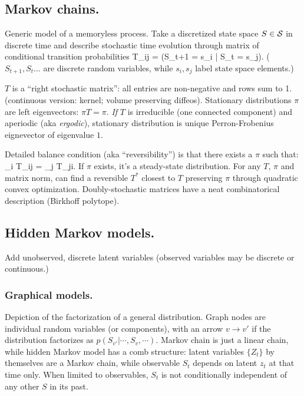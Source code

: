 \documentclass[notitlepage,openany,11pt]{report}
\theoremstyle{plain}%
\numberwithin{equation}{section}
\begin{document}
\subsection{Markov chains.} 
Generic model of a memoryless process. Take a discretized state space $S \in \mathcal{S}$ in discrete time and describe stochastic time evolution through matrix of conditional transition probabilities
\be
T_{ij} = (S_{t+1} = s_{i} | S_{t} = s_{j}).
\ee
($S_{t+1}, S_{t}...$ are discrete random variables, while $s_{i}, s_{j}$ label state space elements.)

$T$ is a ``right stochastic matrix'': all entries are non-negative and rows sum to 1. (continuous version: kernel; volume preserving diffeos). Stationary distributions $\pi$ are left eigenvectors: $\pi T = \pi$. \emph{If} $T$ is irreducible (one connected component) and aperiodic (aka \emph{ergodic}), stationary distribution is unique Perron-Frobenius eignevector of eigenvalue $1$.

Detailed balance condition (aka ``reversibility'') is that there exists a $\pi$ such that:
\be
\pi_{i} T_{ij} = \pi_{j} T_{ji}.
\ee
If $\pi$ exists, it's a steady-state distribution. For any $T$, $\pi$ and matrix norm, can find a reversible $T^{\ast}$ closest to $T$ preserving $\pi$ through quadratic convex optimization. Doubly-stochastic matrices have a neat combinatorical description (Birkhoff polytope).



\subsection{Hidden Markov models.} 
\label{sec-hidden-markov-models}

Add unobserved, discrete latent variables (observed variables may be discrete or continuous.)

\subsubsection{Graphical models.} Depiction of the factorization of a general distribution. Graph nodes are individual random variables (or components), with an arrow $v \to v'$ if the distribution factorizes as $p(S_{v'} | \cdots, S_{v}, \cdots)$. Markov chain is just a linear chain, while hidden Markov model has a comb structure: latent variables $\{Z_{t} \}$ by themselves are a Markov chain, while observable $S_{t}$ depends on latent $z_{t}$ at that time only. When limited to observables, $S_{t}$ is not conditionally independent of any other $S$ in its past.
\end{document}
